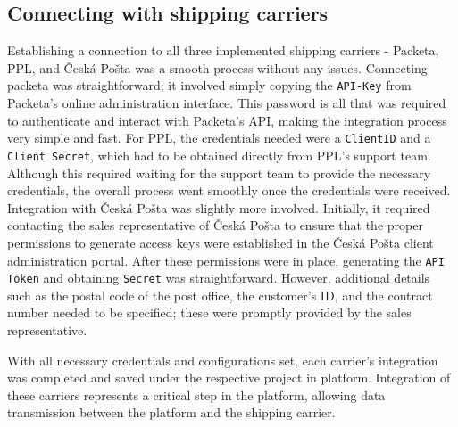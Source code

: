 \subsection{Connecting with shipping carriers}
\label{subsec:connecting-with-shipping-carriers}
Establishing a connection to all three implemented shipping carriers - Packeta, PPL, and Česká Pošta was a smooth process without any issues.
Connecting packeta was straightforward; it involved simply copying the \texttt{API-Key} from Packeta's online administration interface.
This password is all that was required to authenticate and interact with Packeta's API, making the integration process very simple and fast.
For PPL, the credentials needed were a \texttt{ClientID} and a \texttt{Client Secret}, which had to be obtained directly from PPL's support team.
Although this required waiting for the support team to provide the necessary credentials, the overall process went smoothly once the credentials were received.
Integration with Česká Pošta was slightly more involved.
Initially, it required contacting the sales representative of Česká Pošta to ensure that the proper permissions to generate access keys were established in the Česká Pošta client administration portal.
After these permissions were in place, generating the \texttt{API Token} and obtaining \texttt{Secret} was straightforward.
However, additional details such as the postal code of the post office, the customer's ID, and the contract number needed to be specified; these were promptly provided by the sales representative.

With all necessary credentials and configurations set, each carrier's integration was completed and saved under the respective project in platform.
Integration of these carriers represents a critical step in the platform, allowing data transmission between the platform and the shipping carrier.

